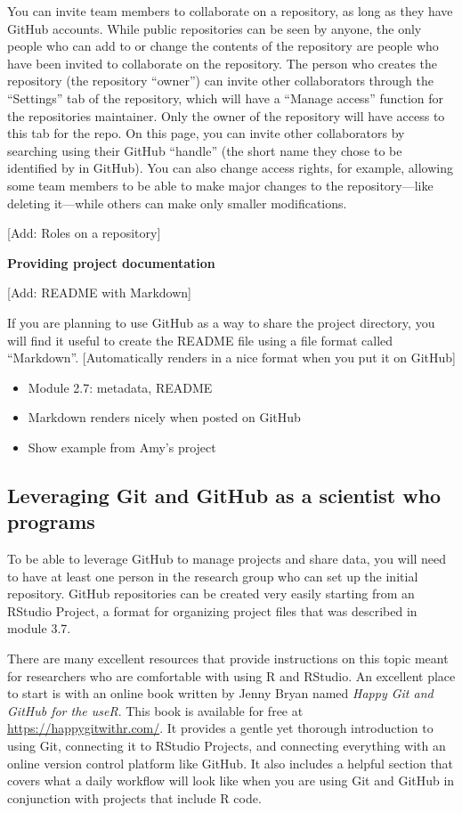 \documentclass[]{tufte-book}
\providecommand{\tightlist}{%
  \setlength{\itemsep}{0pt}\setlength{\parskip}{0pt}}
\begin{document}
You can invite team members to collaborate on a repository, as long as they have
GitHub accounts. While public repositories can be seen by anyone, the only
people who can add to or change the contents of the repository are people who
have been invited to collaborate on the repository. The person who creates the
repository (the repository ``owner'') can invite other collaborators through the
``Settings'' tab of the repository, which will have a ``Manage access'' function for
the repositories maintainer. Only the owner of the repository will have access
to this tab for the repo. On this page, you can invite other collaborators by
searching using their GitHub ``handle'' (the short name they chose to be
identified by in GitHub). You can also change access rights, for example,
allowing some team members to be able to make major changes to the
repository---like deleting it---while others can make only smaller
modifications.

{[}Add: Roles on a repository{]}

\textbf{Providing project documentation}

{[}Add: README with Markdown{]}

If you are planning to use GitHub as a way to share the project directory, you
will find it useful to create the README file using a file format called
``Markdown''. {[}Automatically renders in a nice format when you put it on GitHub{]}

\begin{itemize}
\tightlist
\item
  Module 2.7: metadata, README
\item
  Markdown renders nicely when posted on GitHub
\item
  Show example from Amy's project
\end{itemize}

\subsection{Leveraging Git and GitHub as a scientist who programs}\label{leveraging-git-and-github-as-a-scientist-who-programs}

To be able to leverage GitHub to manage projects and share data, you will need
to have at least one person in the research group who can set up the initial
repository. GitHub repositories can be created very easily starting from an
RStudio Project, a format for organizing project files that was described in
module 3.7.

There are many excellent resources that provide instructions on this topic
meant for researchers who are comfortable with using R and RStudio. An
excellent place to start is with an online book written by Jenny Bryan
named \emph{Happy Git and GitHub for the useR}. This book is available for free
at \url{https://happygitwithr.com/}. It provides a gentle yet thorough introduction
to using Git, connecting it to RStudio Projects, and connecting everything
with an online version control platform like GitHub. It also includes a
helpful section that covers what a daily workflow will look like when you
are using Git and GitHub in conjunction with projects that include R code.
\end{document}
